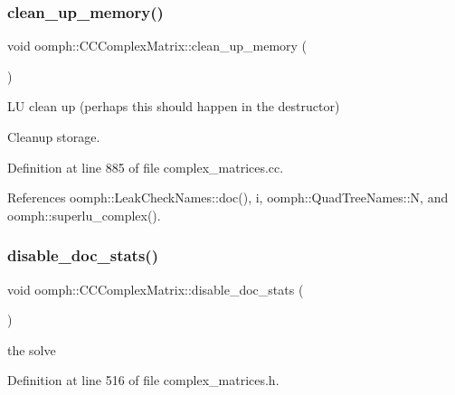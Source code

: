 \subsubsection{\texorpdfstring{clean\+\_\+up\+\_\+memory()}{clean\_up\_memory()}}
{\footnotesize\ttfamily void oomph\+::\+C\+C\+Complex\+Matrix\+::clean\+\_\+up\+\_\+memory (\begin{DoxyParamCaption}{ }\end{DoxyParamCaption})}



LU clean up (perhaps this should happen in the destructor) 

Cleanup storage. 

Definition at line 885 of file complex\+\_\+matrices.\+cc.



References oomph\+::\+Leak\+Check\+Names\+::doc(), i, oomph\+::\+Quad\+Tree\+Names\+::N, and oomph\+::superlu\+\_\+complex().

\mbox{\label{classoomph_1_1CCComplexMatrix_ad5b2b64350d3335d136a8e96ffca267f}} 
\subsubsection{\texorpdfstring{disable\+\_\+doc\+\_\+stats()}{disable\_doc\_stats()}}
{\footnotesize\ttfamily void oomph\+::\+C\+C\+Complex\+Matrix\+::disable\+\_\+doc\+\_\+stats (\begin{DoxyParamCaption}{ }\end{DoxyParamCaption})\hspace{0.3cm}{\ttfamily [inline]}}



the solve 



Definition at line 516 of file complex\+\_\+matrices.\+h.

\mbox{\label{classoomph_1_1CCComplexMatrix_afccd0ba0992ac02b062d8051bcd0d34e}} 
